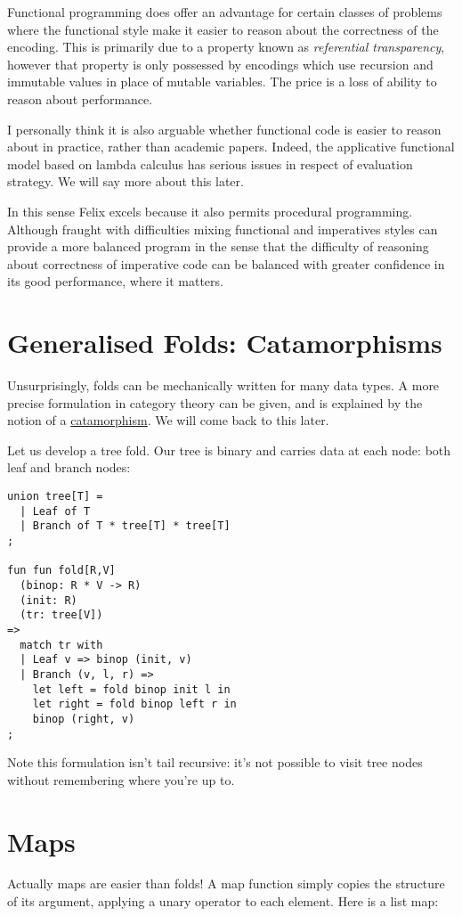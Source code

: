 \documentclass[oneside]{book}
\begin{document}
Functional programming does offer an advantage for certain
classes of problems where the functional style make it
easier to reason about the correctness of the encoding.
This is primarily due to a property known as 
{\em referential transparency}, however that property is only
possessed by encodings which use recursion and immutable
values in place of mutable variables. The price is a loss
of ability to reason about performance.

I personally think it is also arguable whether functional
code is easier to reason about in practice, rather than
academic papers. Indeed, the applicative functional model based on
lambda calculus has serious issues in respect of evaluation
strategy. We will say more about this later.

In this sense Felix excels because it also permits
procedural programming. Although fraught with difficulties
mixing functional and imperatives styles can provide
a more balanced program in the sense that the difficulty
of reasoning about correctness of imperative code
can be balanced with greater confidence in its good
performance, where it matters.


\section{Generalised Folds: Catamorphisms}
Unsurprisingly, folds can be mechanically written
for many data types. A more precise formulation in
category theory can be given, and is explained by
the notion of a
\href{https://en.wikipedia.org/wiki/Catamorphism}{catamorphism}.
We will come back to this later.

Let us develop a tree fold. Our tree is binary and carries
data at each node: both leaf and branch nodes:

\begin{verbatim}
union tree[T] =
  | Leaf of T
  | Branch of T * tree[T] * tree[T]
;

fun fun fold[R,V]
  (binop: R * V -> R)
  (init: R)
  (tr: tree[V])
=>
  match tr with
  | Leaf v => binop (init, v)
  | Branch (v, l, r) =>
    let left = fold binop init l in
    let right = fold binop left r in
    binop (right, v)
;
\end{verbatim}

Note this formulation isn't tail recursive: it's not possible
to visit tree nodes without remembering where you're up to.

\section{Maps}
Actually maps are easier than folds! A map function simply
copies the structure of its argument, applying a unary operator
to each element. Here is a list map:
\end{document}
